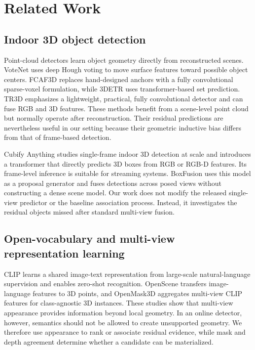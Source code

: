 \documentclass[11pt,a4paper]{article}
\begin{document}
\section{Related Work}
\subsection{Indoor 3D object detection}
Point-cloud detectors learn object geometry directly from reconstructed scenes. VoteNet \cite{qi2019votenet} uses deep Hough voting to move surface features toward possible object centers. FCAF3D \cite{rukhovich2022fcaf3d} replaces hand-designed anchors with a fully convolutional sparse-voxel formulation, while 3DETR \cite{misra20213detr} uses transformer-based set prediction. TR3D \cite{rukhovich2023tr3d} emphasizes a lightweight, practical, fully convolutional detector and can fuse RGB and 3D features. These methods benefit from a scene-level point cloud but normally operate after reconstruction. Their residual predictions are nevertheless useful in our setting because their geometric inductive bias differs from that of frame-based detection.

Cubify Anything \cite{lazarow2024cubify} studies single-frame indoor 3D detection at scale and introduces a transformer that directly predicts 3D boxes from RGB or RGB-D features. Its frame-level inference is suitable for streaming systems. BoxFusion \cite{lan2025boxfusion} uses this model as a proposal generator and fuses detections across posed views without constructing a dense scene model. Our work does not modify the released single-view predictor or the baseline association process. Instead, it investigates the residual objects missed after standard multi-view fusion.

\subsection{Open-vocabulary and multi-view representation learning}
CLIP \cite{radford2021clip} learns a shared image-text representation from large-scale natural-language supervision and enables zero-shot recognition. OpenScene \cite{peng2023openscene} transfers image-language features to 3D points, and OpenMask3D \cite{takmaz2023openmask3d} aggregates multi-view CLIP features for class-agnostic 3D instances. These studies show that multi-view appearance provides information beyond local geometry. In an online detector, however, semantics should not be allowed to create unsupported geometry. We therefore use appearance to rank or associate residual evidence, while mask and depth agreement determine whether a candidate can be materialized.
\end{document}
